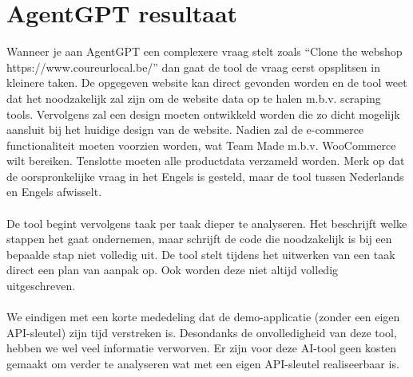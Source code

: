 \documentclass[dutch,dit,thesis]{hogentreport}
\begin{document}
\chapter{AgentGPT resultaat}
\label{agentgpt_resultaat}Wanneer je aan AgentGPT een complexere vraag stelt zoals “Clone the webshop https://www.coureurlocal.be/” dan gaat de tool de vraag eerst opsplitsen in kleinere taken. De opgegeven website kan direct gevonden worden en de tool weet dat het noodzakelijk zal zijn om de website data op te halen m.b.v. scraping tools. Vervolgens zal een design moeten ontwikkeld worden die zo dicht mogelijk aansluit bij het huidige design van de website. Nadien zal de e-commerce functionaliteit moeten voorzien worden, wat Team Made m.b.v. WooCommerce wilt bereiken. Tenslotte moeten alle productdata verzameld worden. Merk op dat de oorspronkelijke vraag in het Engels is gesteld, maar de tool tussen Nederlands en Engels afwisselt.
\\\\
De tool begint vervolgens taak per taak dieper te analyseren. Het beschrijft welke stappen het gaat ondernemen, maar schrijft de code die noodzakelijk is bij een bepaalde stap niet volledig uit. De tool stelt tijdens het uitwerken van een taak direct een plan van aanpak op. Ook worden deze niet altijd volledig uitgeschreven. 
\\\\
We eindigen met een korte mededeling dat de demo-applicatie (zonder een eigen API-sleutel) zijn tijd verstreken is. Desondanks de onvolledigheid van deze tool, hebben we wel veel informatie verworven. Er zijn voor deze AI-tool geen kosten gemaakt om verder te analyseren wat met een eigen API-sleutel realiseerbaar is.

%


\backmatter{}

\setlength\bibitemsep{2pt} %
\printbibliography[heading=bibintoc]
\end{document}
